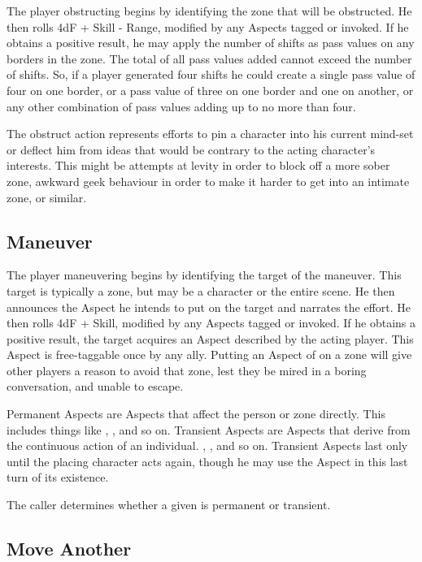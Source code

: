 The player obstructing begins by identifying the zone that will be obstructed. He then rolls 4dF + Skill - Range, modified by any Aspects tagged or invoked. If he obtains a positive result, he may apply the number of shifts as pass values on any borders in the zone. The total of all pass values added cannot exceed the number of shifts. So, if a player generated four shifts he could create a single pass value of four on one border, or a pass value of three on one border and one on another, or any other combination of pass values adding up to no more than four.

The obstruct action represents efforts to pin a character into his current mind-set or deflect him from ideas that would be contrary to the acting character's interests. This might be attempts at levity in order to block off a more sober zone, awkward geek behaviour in order to make it harder to get into an intimate zone, or similar.

\subsection{Maneuver}\label{sec:Maneuver}

The player maneuvering begins by identifying the target of the maneuver. This target is typically a zone, but may be a character or the entire scene. He then announces the Aspect he intends to put on  the target and narrates the effort. He then rolls 4dF + Skill, modified by any Aspects tagged or invoked. If he obtains a positive result, the target acquires an Aspect described by the acting player. This Aspect is free-taggable once by any ally. Putting an Aspect of  on a zone will give other players a reason to avoid that zone, lest they be mired in a boring conversation, and unable to escape.

Permanent Aspects are Aspects that affect the person or zone directly. This includes things like , , and so on. Transient Aspects are Aspects that derive from the continuous action of an individual. , , and so on. Transient Aspects last only until the placing character acts again, though he may use the Aspect in this last turn of its existence.

The caller determines whether a given \Aspect{} is permanent or transient.


\subsection{Move Another}\label{sec:Move Another}

